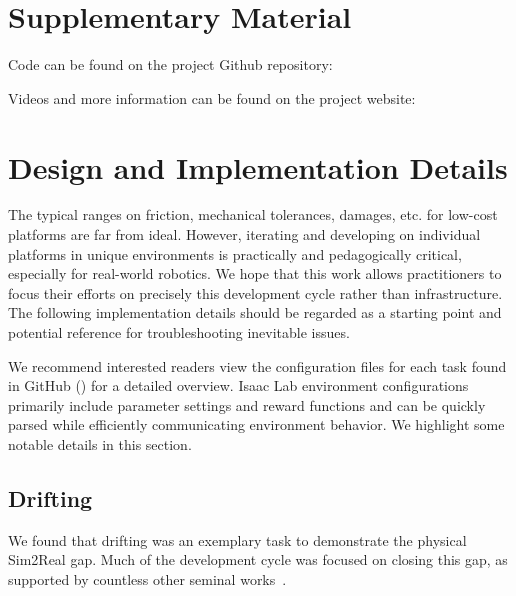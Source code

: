 
\newcommand{\nt}[1]{\textcolor{Green4}{#1}} %
\newcommand{\uwt}[1]{\textcolor{DarkOrchid2}{#1}} %

\begin{appendices}

\section{Supplementary Material}

\noindent Code can be found on the project Github repository:

\githubliteral

\noindent Videos and more information can be found on the project website:

{\small\websiteliteral}

\section{Design and Implementation Details}\label{app:implementation}

The typical ranges on friction, mechanical tolerances, damages, etc. for low-cost platforms are far from ideal. However, iterating and developing on individual platforms in unique environments is practically and pedagogically critical, especially for real-world robotics. We hope that this work allows practitioners to focus their efforts on precisely this development cycle rather than infrastructure. The following implementation details should be regarded as a starting point and potential reference for troubleshooting inevitable issues.

We recommend interested readers view the configuration files for each task found in GitHub (\githubliteral) for a detailed overview. Isaac Lab environment configurations primarily include parameter settings and reward functions and can be quickly parsed while efficiently communicating environment behavior. We highlight some notable details in this section.

\subsection{Drifting}\label{app:drift-impl}

We found that drifting was an exemplary task to demonstrate the physical Sim2Real gap. Much of the development cycle was focused on closing this gap, as supported by countless other seminal works~\cite{openai_solving_2019, hoeller_anymal_2024}. 


\end{appendices}
